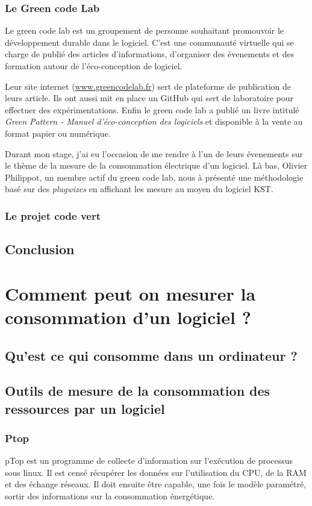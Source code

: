\documentclass[a4paper, 11pt]{report}
\begin{document}
		\subsection{Le Green code Lab}
Le green code lab est un groupement de personne souhaitant promouvoir le développement durable dans le logiciel. C'est une communauté virtuelle qui se charge de publié des articles d'informations, d'organiser des évenements et des formation autour de l'éco-conception de logiciel.

Leur site internet (\href{http://www.greencodelab.fr}{www.greencodelab.fr}) sert de plateforme de publication de leurs article. Ils ont aussi mit en place un GitHub qui sert de laboratoire pour effectuer des expérimentations. Enfin le green code lab a publié un livre intitulé \textit{Green Pattern - Manuel d'éco-conception des logiciels} et disponible à la vente au format papier ou numérique.

Durant mon stage, j'ai eu l'occasion de me rendre à l'un de leurs évenements sur le thème de la mesure de la consommation électrique d'un logiciel. Là bas, Olivier Philippot, un membre actif du green code lab, nous à présenté une méthodologie basé sur des \textit{plugwizes} en affichant les mesure au moyen du logiciel KST.
		\subsection{Le projet code vert}

		
	\section{Conclusion}

\chapter{Comment peut on mesurer la consommation d'un logiciel ?}
	\section{Qu'est ce qui consomme dans un ordinateur ?}
	\section{Outils de mesure de la consommation des ressources par un logiciel}
		\subsection{Ptop}
pTop est un programme de collecte d’information sur l'exécution de processus sous linux. Il est censé récupérer les données sur l'utilisation du CPU, de la RAM et des échange réseaux. Il doit ensuite être capable, une fois le modèle paramétré, sortir des informations sur la consommation énergétique.
\end{document}
